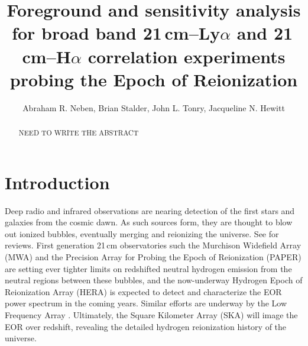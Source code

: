 \documentclass{emulateapj}
\begin{document}
\title{Foreground and sensitivity analysis for broad band 21\,cm--Ly$\alpha$ and 21\,cm--H$\alpha$ correlation experiments probing the Epoch of Reionization}


\author{Abraham R. Neben,
Brian Stalder,
John L. Tonry,
Jacqueline N. Hewitt}




\begin{abstract}
NEED TO WRITE THE ABSTRACT
\end{abstract}


\section{Introduction}

Deep radio and infrared observations are nearing detection of the first stars and galaxies from the cosmic dawn. As such sources form, they are thought to blow out ionized bubbles, eventually merging and reionizing the universe. See \citet{FurlanettoReview,miguelreview,PritchardLoebReview,Mesinger16} for reviews. First generation 21\,cm observatories such the Murchison Widefield Array (MWA) \citep{tingay13,mwascience} and the Precision Array for Probing the Epoch of Reionization (PAPER) \citep{parsons14,ali15,PoberPAPER64Heating,DannyMultiRedshift} are setting ever tighter limits on redshifted neutral hydrogen emission from the neutral regions between these bubbles, and the now-underway Hydrogen Epoch of Reionization Array (HERA) \citep{deboer16} is expected to detect and characterize the EOR power spectrum in the coming years. Similar efforts are underway by the Low Frequency Array \citep{lofareorpaper,lofar}. Ultimately, the Square Kilometer Array (SKA)  \citep{ska} will image the EOR over redshift, revealing the detailed hydrogen reionization history of the universe. 
\end{document}
